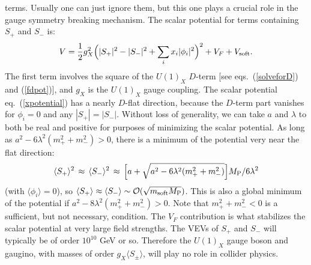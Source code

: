 \documentclass[11pt]{article}
\def\beq{\begin{eqnarray}}
\def\eeq{\end{eqnarray}}
\def\MPlanck{M_{\rm P}}
\def\Splus{S_+}
\def\Sminus{S_-}
\begin{document}
terms. Usually one can just ignore them, but this one plays a crucial role
in the gauge symmetry breaking mechanism. The scalar potential for terms
containing $\Splus$ and $\Sminus$ is: 
\beq
V =
{1\over 2} g_X^2 \Bigl ( |\Splus|^2 - |\Sminus|^2 + \sum_i x_i |\phi_i|^2
\Bigr )^2 + V_F + V_{\rm soft}.
\label{xpotential}
\eeq
The first term involves the square of the $U(1)_X$ $D$-term [see
eqs.~(\ref{solveforD}) and (\ref{fdpot})], and $g_X$ is the $U(1)_X$ gauge
coupling. The scalar potential eq.~(\ref{xpotential}) has a nearly
$D$-flat direction, because the $D$-term part vanishes for $\phi_i=0$ and
any $|\Splus| = |\Sminus|$. Without loss of generality, we can take $a$
and $\lambda$ to both be real and positive for purposes of minimizing the
scalar potential. As long as $a^2 - 6 \lambda^2 (m_+^2 + m_-^2) >
0$, there is a minimum of the potential very near the flat direction: 
\beq
\langle \Splus \rangle^2 \,\approx\, \langle \Sminus \rangle^2
\, \approx \, 
\Bigl [a + \sqrt{ a^2 - 6 \lambda^2 (m_+^2 + m_-^2) } \Bigr ]
\MPlanck/6 \lambda^2
\eeq
(with $\langle \phi_i\rangle = 0$), so $\langle \Splus \rangle \approx
\langle \Sminus \rangle \sim {\cal O}(\sqrt{m_{\rm soft} \MPlanck})$. This
is also a global minimum of the potential if $a^2 - 8 \lambda^2 (m_+^2
+ m_-^2) > 0$. Note that $m_+^2 + m_-^2 < 0$ is a sufficient,
but not necessary, condition. The $V_F$ contribution is what stabilizes
the scalar potential at very large field strengths. The VEVs of $\Splus$
and $\Sminus$ will typically be of order $10^{10}$ GeV or so. Therefore
the $U(1)_X$ gauge boson and gaugino, with masses of order $g_X \langle
S_\pm\rangle$, will play no role in collider physics. 
\end{document}
